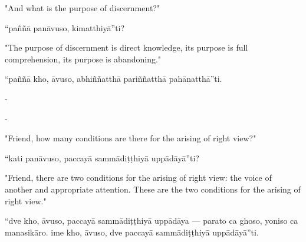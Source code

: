 \begin{samepage}
\begin{leftcolumn*}
"And what is the purpose of discernment?"
\end{leftcolumn*}

\begin{rightcolumn}
“paññā panāvuso, kimatthiyā”ti?
\end{rightcolumn}
\end{samepage}

\begin{samepage}
\begin{leftcolumn*}
"The purpose of discernment is direct knowledge, its purpose is full comprehension, its purpose is abandoning."
\end{leftcolumn*}

\begin{rightcolumn}
“paññā kho, āvuso, abhiññatthā pariññatthā pahānatthā”ti.
\end{rightcolumn}
\end{samepage}

\begin{samepage}
\begin{leftcolumn*}
-
\end{leftcolumn*}

\begin{rightcolumn}
-
\end{rightcolumn}
\end{samepage}

\begin{samepage}
\begin{leftcolumn*}
"Friend, how many conditions are there for the arising of right view?"
\end{leftcolumn*}

\begin{rightcolumn}
“kati panāvuso, paccayā sammādiṭṭhiyā uppādāyā”ti?
\end{rightcolumn}
\end{samepage}

\begin{samepage}
\begin{leftcolumn*}
"Friend, there are two conditions for the arising of right view: the voice of another and appropriate attention. These are the two conditions for the arising of right view."
\end{leftcolumn*}

\begin{rightcolumn}
“dve kho, āvuso, paccayā sammādiṭṭhiyā uppādāya — parato ca ghoso, yoniso ca manasikāro. ime kho, āvuso, dve paccayā sammādiṭṭhiyā uppādāyā”ti.
\end{rightcolumn}
\end{samepage}

